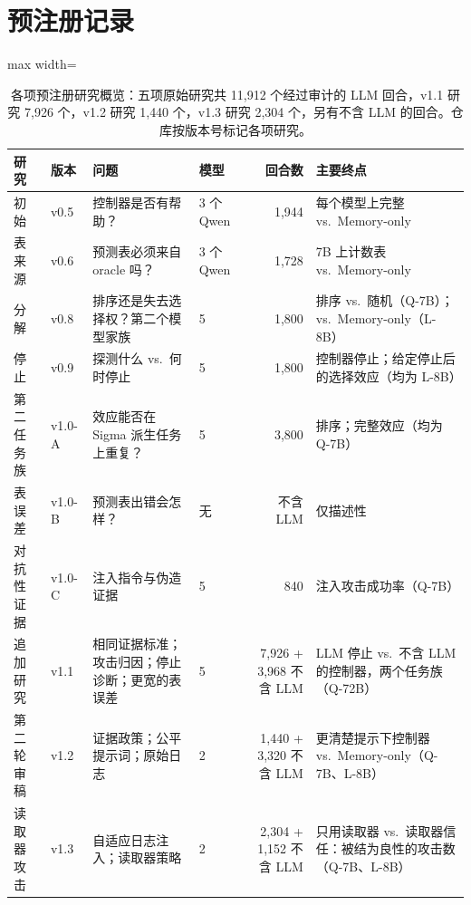 \section{预注册记录}
\label{app:prereg}

\begin{table}[t]
  \caption{各项预注册研究概览：五项原始研究共 11{,}912 个经过审计的 LLM 回合，v1.1 研究 7{,}926 个，v1.2 研究 1{,}440 个，v1.3 研究 2{,}304 个，另有不含 LLM 的回合。仓库按版本号标记各项研究。}
  \label{tab:studies}
  \centering\small
  \begin{adjustbox}{max width=\textwidth}
  \begin{tabular}{llllrl}
    \toprule
    研究 & 版本 & 问题 & 模型 & 回合数 & 主要终点 \\
    \midrule
    初始 & v0.5 & 控制器是否有帮助？ & 3 个 Qwen & 1{,}944 & 每个模型上完整 \hesp{} vs.\ Memory-only \\
    表来源 & v0.6 & 预测表必须来自 oracle 吗？ & 3 个 Qwen & 1{,}728 & 7B 上计数表 \hesp{} vs.\ Memory-only \\
    分解 & v0.8 & 排序还是失去选择权？第二个模型家族 & 5 & 1{,}800 & 排序 vs.\ 随机（Q-7B）；\hesp{} vs.\ Memory-only（L-8B） \\
    停止 & v0.9 & 探测什么 vs.\ 何时停止 & 5 & 1{,}800 & 控制器停止；给定停止后的选择效应（均为 L-8B） \\
    \midrule
    第二任务族 & v1.0-A & 效应能否在 Sigma 派生任务上重复？ & 5 & 3{,}800 & 排序；完整效应（均为 Q-7B） \\
    表误差 & v1.0-B & 预测表出错会怎样？ & 无 & 不含 LLM & 仅描述性 \\
    对抗性证据 & v1.0-C & 注入指令与伪造证据 & 5 & 840 & 注入攻击成功率（Q-7B） \\
    \midrule
    追加研究 & v1.1 & 相同证据标准；攻击归因；停止诊断；更宽的表误差 & 5 & 7{,}926 + 3{,}968 不含 LLM & LLM 停止 vs.\ 不含 LLM 的控制器，两个任务族（Q-72B） \\
    第二轮审稿 & v1.2 & 证据政策；公平提示词；原始日志 & 2 & 1{,}440 + 3{,}320 不含 LLM & 更清楚提示下控制器 vs.\ Memory-only（Q-7B、L-8B） \\
    读取器攻击 & v1.3 & 自适应日志注入；读取器策略 & 2 & 2{,}304 + 1{,}152 不含 LLM & 只用读取器 vs.\ 读取器信任：被结为良性的攻击数（Q-7B、L-8B） \\
    \bottomrule
  \end{tabular}
  \end{adjustbox}
\end{table}

